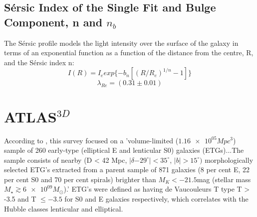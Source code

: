 \subsection{S\'ersic Index of the Single Fit and Bulge Component, n and $n_{b}$}
The S\'ersic profile models the light intensity over the surface of the galaxy in terms of an exponential function as a function of the distance from the centre, R, and the S\'ersic index n:
\begin{equation}
I(R) = I_{e} exp\{-b_{n} [(R/R_{e})^{1/n}-1]\}
\end{equation}
\begin{equation}
\lambda_{Re}=(0.31\pm0.01)
\end{equation}
\section{ATLAS$^{3D}$}
According to \cite{Cappellari2011}, this survey focused on a 'volume-limited ($\num{1.16e05} Mpc^{3}$) sample of 260 early-type (elliptical E and lenticular S0) galaxies (ETGs)...The sample consists of nearby (D < 42 Mpc, $|\delta \num{-29}^{\circ}| < 35^{\circ}$, $|b| > 15^{\circ})$ morphologically selected ETG's extracted from a parent sample of 871 galaxies (8 per cent E, 22 per cent S0 and
70 per cent spirals) brighter than $M_{K} <\num{-21.5} $mag (stellar mass $M_{\star} \gtrsim \num{6e09} M_{\odot}$).' ETG's were defined as having de Vaucouleurs T type T > -3.5 and T $\leq -3.5$ for S0 and E galaxies respectively, which correlates with the Hubble classes lenticular and elliptical.


